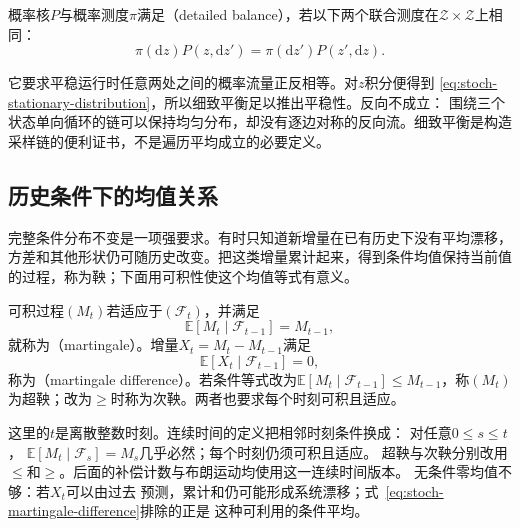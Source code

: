\begin{definition}[细致平衡]
  \label{def:stoch-detailed-balance}
概率核\(P\)与概率测度\(\pi\)满足（detailed balance），若以下两个联合测度在\(\mathcal Z\times\mathcal Z\)上相同：
\begin{equation}
  \pi(\mathrm{d}z)P(z,\mathrm{d}z')
  =\pi(\mathrm{d}z')P(z',\mathrm{d}z).
  \label{eq:stoch-detailed-balance}
\end{equation}
\end{definition}
它要求平稳运行时任意两处之间的概率流量正反相等。对$z$积分便得到
\eqref{eq:stoch-stationary-distribution}，所以细致平衡足以推出平稳性。反向不成立：
围绕三个状态单向循环的链可以保持均匀分布，却没有逐边对称的反向流。细致平衡是构造
采样链的便利证书，不是遍历平均成立的必要定义。
\subsection{历史条件下的均值关系}

完整条件分布不变是一项强要求。有时只知道新增量在已有历史下没有平均漂移，方差和其他形状仍可随历史改变。把这类增量累计起来，得到条件均值保持当前值的过程，称为鞅；下面用可积性使这个均值等式有意义。
\label{sec:rv-martingales}
\begin{definition}[鞅与鞅差]
  \label{def:stoch-martingale}
可积过程$(M_t)$若适应于$(\mathcal{F}_t)$，并满足
\begin{equation}
  \mathbb{E}[M_t\mid\mathcal{F}_{t-1}]=M_{t-1},
  \label{eq:stoch-martingale-definition}
\end{equation}
就称为（martingale）。增量$X_t=M_t-M_{t-1}$满足
\begin{equation}
  \mathbb{E}[X_t\mid\mathcal{F}_{t-1}]=0,
  \label{eq:stoch-martingale-difference}
\end{equation}
称为（martingale difference）。若条件等式改为\(\mathbb E[M_t\mid\mathcal F_{t-1}]\leq M_{t-1}\)，称\((M_t)\)为超鞅；改为\(\geq\)时称为次鞅。两者也要求每个时刻可积且适应。
\end{definition}
这里的\(t\)是离散整数时刻。连续时间的定义把相邻时刻条件换成：
对任意\(0\leq s\leq t\)，
\(\mathbb E[M_t\mid\mathcal F_s]=M_s\)几乎必然；每个时刻仍须可积且适应。
超鞅与次鞅分别改用\(\leq\)和\(\geq\)。后面的补偿计数与布朗运动均使用这一连续时间版本。
无条件零均值不够：若$X_t$可以由过去
预测，累计和仍可能形成系统漂移；式~\eqref{eq:stoch-martingale-difference}排除的正是
这种可利用的条件平均。

